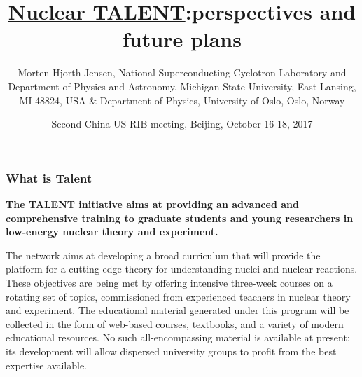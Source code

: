 \documentclass{beamer}
\begin{document}

\newcommand{\exercisesection}[1]{\subsection*{#1}}







\title{\href{{http://www.nucleartalent.org}}{Nuclear TALENT}:perspectives and future plans}


\author{Morten Hjorth-Jensen, National Superconducting Cyclotron Laboratory and Department of Physics and Astronomy, Michigan State University, East Lansing, MI 48824, USA {\&} Department of Physics, University of Oslo, Oslo, Norway\inst{}}
\institute{}

\date{Second China-US RIB meeting, Beijing, October 16-18, 2017
}

\begin{frame}
\titlepage
\end{frame}

\begin{frame}
\frametitle{\href{{http://www.nucleartalent.org}}{What is Talent}}

\begin{block}{}
\textbf{The TALENT initiative aims at providing an advanced and comprehensive training to graduate students and young researchers in low-energy nuclear theory and experiment.}

The network aims at developing a broad curriculum that will provide the platform for a cutting-edge theory for understanding nuclei and nuclear reactions. These objectives are being met by offering intensive three-week courses on a rotating set of topics, commissioned from experienced teachers in nuclear theory and experiment. The educational material generated under this program will be collected in the form of web-based courses, textbooks, and a variety of modern educational resources. No such all-encompassing material is available at present; its development will allow dispersed university groups to profit from the best expertise available.

\end{block}
\end{frame}
\end{document}
